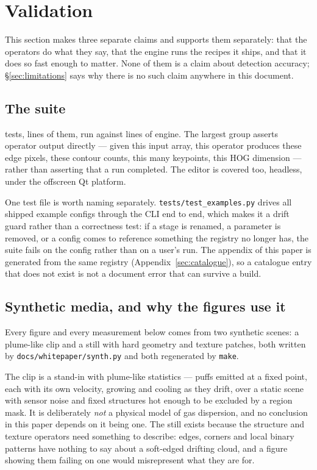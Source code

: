 \section{Validation}
\label{sec:validation}

This section makes three separate claims and supports them separately: that the
operators do what they say, that the engine runs the recipes it ships, and that
it does so fast enough to matter. None of them is a claim about detection
accuracy; §\ref{sec:limitations} says why there is no such claim anywhere in this
document.

\subsection{The suite}

\NumTests{} tests, \TestLOC{} lines of them, run against \RepoLOC{} lines of
engine. The largest group asserts operator output directly --- given this input
array, this operator produces these edge pixels, these contour counts, this many
keypoints, this HOG dimension --- rather than asserting that a run completed. The
editor is covered too, headless, under the offscreen Qt platform.

One test file is worth naming separately. \texttt{tests/test\_examples.py} drives
all \NumExamples{} shipped example configs through the CLI end to end, which
makes it a drift guard rather than a correctness test: if a stage is renamed, a
parameter is removed, or a config comes to reference something the registry no
longer has, the suite fails on the config rather than on a user's run. The
appendix of this paper is generated from the same registry
(Appendix~\ref{sec:catalogue}), so a catalogue entry that does not exist is not a
document error that can survive a build.

\subsection{Synthetic media, and why the figures use it}

Every figure and every measurement below comes from two synthetic scenes: a
plume-like clip and a still with hard geometry and texture patches, both written
by \texttt{docs/whitepaper/synth.py} and both regenerated by \texttt{make}.

The clip is a stand-in with plume-like statistics --- puffs emitted at a fixed
point, each with its own velocity, growing and cooling as they drift, over a
static scene with sensor noise and fixed structures hot enough to be excluded by
a region mask. It is deliberately \emph{not} a physical model of gas dispersion,
and no conclusion in this paper depends on it being one. The still exists because
the structure and texture operators need something to describe: edges, corners
and local binary patterns have nothing to say about a soft-edged drifting cloud,
and a figure showing them failing on one would misrepresent what they are for.

